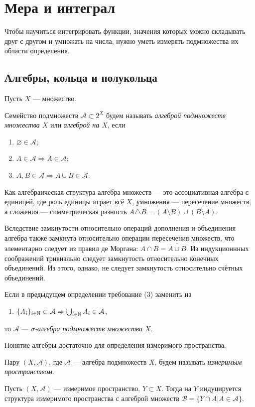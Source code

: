 \section{Мера и интеграл}

Чтобы научиться интегрировать функции, значения которых можно складывать друг с другом и умножать на числа, нужно уметь измерять подмножества их области определения.

\subsection{Алгебры, кольца и полукольца}
Пусть $X$ --- множество. 
\begin{defin}
	Семейство подмножеств $\mathcal{A}\subset 2^X$ будем называть \textit{алгеброй подмножеств множества $X$} или \textit{алгеброй на $X$}, если
		\begin{enumerate}
			\item $\varnothing\in\mathcal{A}$;
			\item $A\in\mathcal{A}\Rightarrow\overline{A}\in\mathcal{A}$;
			\item $A,B\in\mathcal{A}\Rightarrow A\cup B\in\mathcal{A}$.
		\end{enumerate}
\end{defin}
Как алгебраическая структура алгебра множеств --- это ассоциативная алгебра с единицей, где роль единицы играет всё $X$, умножения --- пересечение множеств, а сложения --- симметрическая разность $A\triangle B=(A\setminus B)\cup(B\setminus A)$.

Вследствие замкнутости относительно операций дополнения и объединения алгебра также замкнута относительно операции пересечения множеств, что элементарно следует из правил де Моргана: $A\cap B=\overline{\overline{A}\cup\overline{B}}$. Из индукционнных соображений тривиально следует замкнутость относительно конечных объединений. Из этого, однако, не следует замкнутость относительно счётных объединений.
\begin{defin}
	Если в предыдущем определении требование (3) заменить на
		\begin{enumerate}
			\item $\{A_i\}_{i\in\mathbb {N}}\subset\mathcal{A}\Rightarrow \bigcup_{i\in\mathbb {N}} A_i\in\mathcal{A}$,
		\end{enumerate}
	то $\mathcal{A}$ --- \textit{$\sigma$-алгебра подмножеств множества $X$}.
\end{defin}

Понятие алгебры достаточно для определения измеримого пространства. 
\begin{defin}
	Пару $(X,\mathcal{A})$, где $\mathcal{A}$ --- алгебра подмножеств $X$, будем называть \textit{измеримым пространством}.
\end{defin}
\begin{defin}
	Пусть $(X,\mathcal{A})$ --- измеримое пространство, $Y\subset X$. Тогда на $Y$ индуцируется структура измеримого пространства с алгеброй множеств $\mathcal{B}=\{Y\cap A|A\in\mathcal{A}\}$.
\end{defin}

